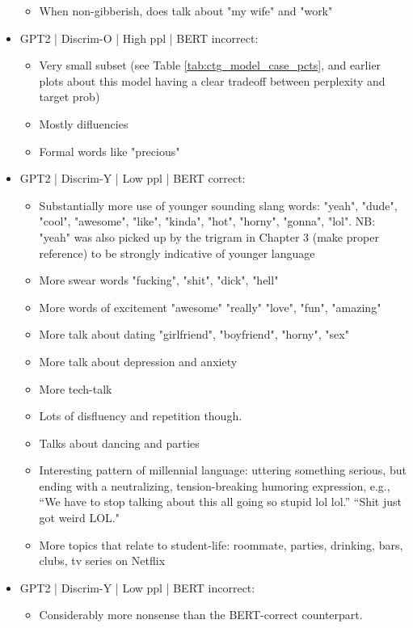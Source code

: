 \begin{itemize}
\begin{itemize}
        \item When non-gibberish, does talk about "my wife" and "work"
    \end{itemize}
    \item GPT2 | Discrim-O | High ppl | BERT incorrect:
    \begin{itemize}
        \item Very small subset (see Table \ref{tab:ctg_model_case_pcts}, and earlier plots about this model having a clear tradeoff between perplexity and target prob)
        \item Mostly difluencies
        \item Formal words like "precious"
    \end{itemize}
    \item GPT2 | Discrim-Y | Low ppl | BERT correct:
    \begin{itemize}
        \item Substantially more use of younger sounding slang words: "yeah", "dude", "cool", "awesome", "like", "kinda", "hot", "horny", "gonna", "lol". NB: "yeah" was also picked up by the trigram in Chapter 3 (make proper reference) to be strongly indicative of younger language
        \item More swear words "fucking", "shit", "dick", "hell"
        \item More words of excitement "awesome" "really" "love", "fun", "amazing"
        \item More talk about dating "girlfriend", "boyfriend", "horny", "sex"
        \item More talk about depression and anxiety
        \item More tech-talk
        \item Lots of disfluency and repetition though.
        \item Talks about dancing and parties
        \item Interesting pattern of millennial language: uttering something serious, but ending with a neutralizing, tension-breaking humoring expression, e.g., ``We have to stop talking about this all going so stupid lol lol.'' ``Shit just got weird LOL."
        \item More topics that relate to student-life: roommate, parties, drinking, bars, clubs, tv series on Netflix
    \end{itemize}
    \item GPT2 | Discrim-Y | Low ppl | BERT incorrect:
    \begin{itemize}
        \item Considerably more nonsense than the BERT-correct counterpart. 

\end{itemize}
\end{itemize}
